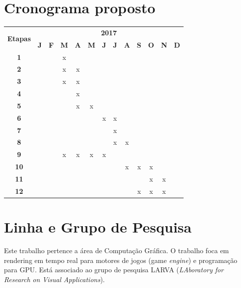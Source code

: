 \documentclass[11pt]{article}
\begin{document}
\section{Cronograma proposto}
\label{cro}

\vspace{0.5cm}
{\tiny
\noindent \begin{tabular}{|c||c|c|c|c|c|c|c|c|c|c|c|c|}
  \hline
  \multirow{2}{*}{\textbf{\small{Etapas}}} & \multicolumn{12}{|c||}{\textbf{\small{2017}}} \\
  \cline{2-13}
   & \textbf{J} & \textbf{F} & \textbf{M} & \textbf{A} & \textbf{M} & \textbf{J} & \textbf{J} & \textbf{A} & \textbf{S} & \textbf{O} & \textbf{N} & \textbf{D} \\
  \hline
  \hline
    \textbf{\small{1}} & & & x & & & & & & & & & \\
  \hline
    \textbf{\small{2}} & & & x & x & & & &  &  & & & \\
  \hline
    \textbf{\small{3}} & & & x & x & & & & & & & & \\
  \hline
    \textbf{\small{4}} & & & & x & & & & & & & & \\
  \hline
    \textbf{\small{5}} & & & & x & x & & & & & & & \\
  \hline
    \textbf{\small{6}} & & & & & & x & x & & & & & \\
  \hline
    \textbf{\small{7}} & & & & & & & x & & & & & \\
  \hline
    \textbf{\small{8}} & & & & & & & x & x & & & & \\
  \hline
    \textbf{\small{9}} & & & x & x & x & x & & & & & & \\
  \hline
    \textbf{\small{10}} & & & & & & & & x & x & x & & \\
  \hline
    \textbf{\small{11}} & & & & & & & & & & x & x & \\
  \hline
    \textbf{\small{12}} & & & & & & & & & x & x & x & \\
  \hline
\end{tabular}
}


\section{Linha e Grupo de Pesquisa}

Este trabalho pertence a área de Computação Gráfica. O trabalho foca
em rendering em tempo real para motores de jogos (game \textit{engine}) e
programação para GPU. Está associado ao grupo de pesquisa LARVA
(\textit{LAboratory for Research on Visual Applications}).
\end{document}

